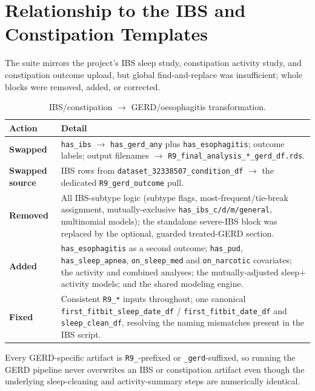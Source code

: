 \documentclass[11pt]{article}
\newcommand{\code}[1]{\texttt{\small #1}}
\begin{document}
\section{Relationship to the IBS and Constipation Templates}
The suite mirrors the project's IBS sleep study, constipation activity study, and constipation outcome
upload, but global find-and-replace was insufficient; whole blocks were removed, added, or corrected.

\begin{table}[h]
\centering
\footnotesize
\begin{tabular}{@{}p{2.1cm}p{11.4cm}@{}}
\toprule
\textbf{Action} & \textbf{Detail} \\
\midrule
\textbf{Swapped} & \code{has_ibs} $\rightarrow$ \code{has_gerd_any} plus \code{has_esophagitis}; outcome
labels; output filenames $\rightarrow$ \code{R9_final_analysis_*_gerd_df.rds}. \\
\textbf{Swapped source} & IBS rows from \code{dataset_32338507_condition_df} $\rightarrow$ the dedicated
\code{R9_gerd_outcome} pull. \\
\textbf{Removed} & All IBS-subtype logic (subtype flags, most-frequent/tie-break assignment,
mutually-exclusive \code{has_ibs_c/d/m/general}, multinomial models); the standalone severe-IBS block
was replaced by the optional, guarded treated-GERD section. \\
\textbf{Added} & \code{has_esophagitis} as a second outcome; \code{has_pud}, \code{has_sleep_apnea}, \code{on_sleep_med} and \code{on_narcotic}
covariates; the activity and combined analyses; the mutually-adjusted sleep$+$activity models; and the
shared modeling engine. \\
\textbf{Fixed} & Consistent \code{R9_*} inputs throughout; one canonical
\code{first_fitbit_sleep_date_df} / \code{first_fitbit_date_df} and \code{sleep_clean_df}, resolving the
naming mismatches present in the IBS script. \\
\bottomrule
\end{tabular}
\caption{IBS/constipation $\rightarrow$ GERD/oesophagitis transformation.}
\end{table}

\noindent Every GERD-specific artifact is \code{R9_}-prefixed or \code{_gerd}-suffixed, so running the
GERD pipeline never overwrites an IBS or constipation artifact even though the underlying
sleep-cleaning and activity-summary steps are numerically identical.
\end{document}
